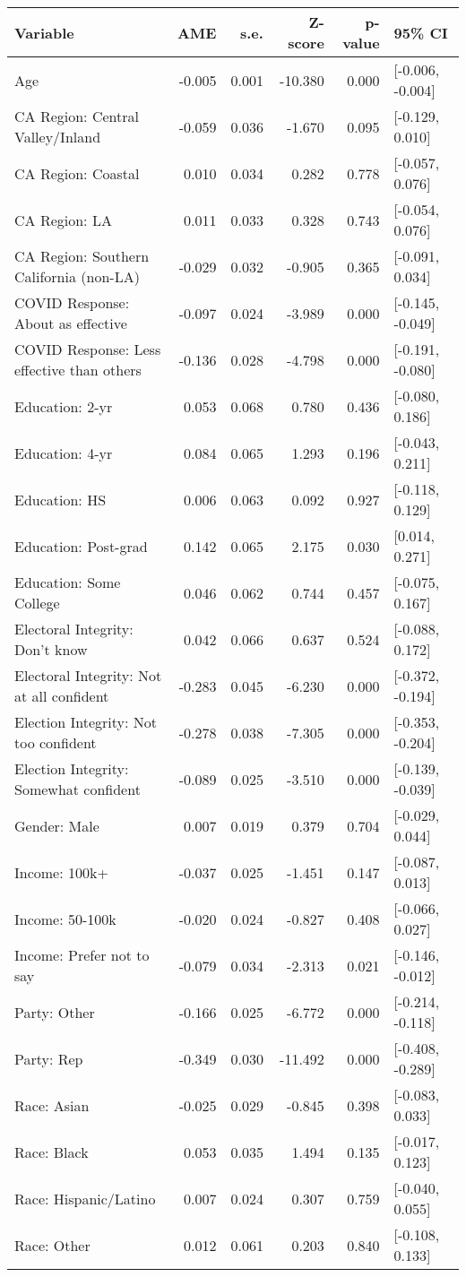\begin{tabular}{lrrrrl}
  \toprule
Variable & AME & s.e. & Z-score & p-value & 95\% CI \\ 
  \midrule
Age & -0.005 & 0.001 & -10.380 & 0.000 & [-0.006, -0.004] \\ 
  CA Region: Central Valley/Inland & -0.059 & 0.036 & -1.670 & 0.095 & [-0.129, 0.010] \\ 
  CA Region: Coastal & 0.010 & 0.034 & 0.282 & 0.778 & [-0.057, 0.076] \\ 
  CA Region: LA & 0.011 & 0.033 & 0.328 & 0.743 & [-0.054, 0.076] \\ 
  CA Region: Southern California (non-LA) & -0.029 & 0.032 & -0.905 & 0.365 & [-0.091, 0.034] \\ 
  COVID Response: About as effective & -0.097 & 0.024 & -3.989 & 0.000 & [-0.145, -0.049] \\ 
  COVID Response: Less effective than others & -0.136 & 0.028 & -4.798 & 0.000 & [-0.191, -0.080] \\ 
  Education: 2-yr & 0.053 & 0.068 & 0.780 & 0.436 & [-0.080, 0.186] \\ 
  Education: 4-yr & 0.084 & 0.065 & 1.293 & 0.196 & [-0.043, 0.211] \\ 
  Education: HS & 0.006 & 0.063 & 0.092 & 0.927 & [-0.118, 0.129] \\ 
  Education: Post-grad & 0.142 & 0.065 & 2.175 & 0.030 & [0.014, 0.271] \\ 
  Education: Some College & 0.046 & 0.062 & 0.744 & 0.457 & [-0.075, 0.167] \\ 
  Electoral Integrity: Don't know & 0.042 & 0.066 & 0.637 & 0.524 & [-0.088, 0.172] \\ 
  Electoral Integrity: Not at all confident & -0.283 & 0.045 & -6.230 & 0.000 & [-0.372, -0.194] \\ 
  Election Integrity: Not too confident & -0.278 & 0.038 & -7.305 & 0.000 & [-0.353, -0.204] \\ 
  Election Integrity: Somewhat confident & -0.089 & 0.025 & -3.510 & 0.000 & [-0.139, -0.039] \\ 
  Gender: Male & 0.007 & 0.019 & 0.379 & 0.704 & [-0.029, 0.044] \\ 
  Income: 100k+ & -0.037 & 0.025 & -1.451 & 0.147 & [-0.087, 0.013] \\ 
  Income: 50-100k & -0.020 & 0.024 & -0.827 & 0.408 & [-0.066, 0.027] \\ 
  Income: Prefer not to say & -0.079 & 0.034 & -2.313 & 0.021 & [-0.146, -0.012] \\ 
  Party: Other & -0.166 & 0.025 & -6.772 & 0.000 & [-0.214, -0.118] \\ 
  Party: Rep & -0.349 & 0.030 & -11.492 & 0.000 & [-0.408, -0.289] \\ 
  Race: Asian & -0.025 & 0.029 & -0.845 & 0.398 & [-0.083, 0.033] \\ 
  Race: Black & 0.053 & 0.035 & 1.494 & 0.135 & [-0.017, 0.123] \\ 
  Race: Hispanic/Latino & 0.007 & 0.024 & 0.307 & 0.759 & [-0.040, 0.055] \\ 
  Race: Other & 0.012 & 0.061 & 0.203 & 0.840 & [-0.108, 0.133] \\ 
   \bottomrule
\end{tabular}
